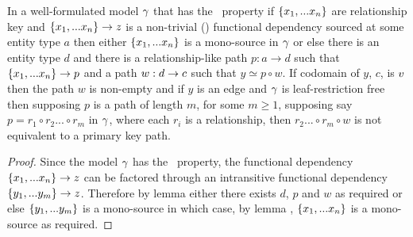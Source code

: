 \begin{oldtt}
\begin{lemma}
 
In a well-formulated model $\gamma$ that has the \fdfactoring\ property if $\left\{x_1,...x_n\right\}$ are relationship key 
 and
$\left\{x_1,...x_n\right\} \rightarrow z$ is a non-trivial () functional dependency sourced
at some entity type $a$ then either $\left\{x_1,...x_n\right\}$ is a mono-source in $\gamma$
or else there is an entity type $d$ and there is a
relationship-like path $p:a \rightarrow d$ such that $\left\{x_1,...x_n\right\} \rightarrow p$ and a  path $w:d \rightarrow c$  such that $y \simeq p \circ w$. 
If codomain of $y$, $c$, is $v$ then
the path $w$ is non-empty and if $y$ is an edge and $\gamma$ is leaf-restriction free then 
supposing $p$ is a path of length $m$, for some $m \geq 1$, supposing say $ p = r_1 \circ r_2 ... \circ r_m$ 
 in $\gamma$,   where each $r_i$ is a relationship, then $r_2 ... \circ r_m \circ w$
is not equivalent to a primary key path.
\end{lemma}
\begin{proof}
Since the model $\gamma$  has the \fdfactoring\ property, the functional dependency $\left\{x_1,...x_n\right\} \rightarrow z$ can be factored through an intransitive functional 
dependency $\left\{y_1,...y_m\right\} \rightarrow z$. Therefore by lemma  either there exists $d$, $p$ and $w$ as required
or else  $\left\{y_1,...y_{m}\right\}$ is a mono-source in which case, by lemma , $\left\{x_1,...x_n\right\}$ is a mono-source as required.
\end{proof}
\end{oldtt}

